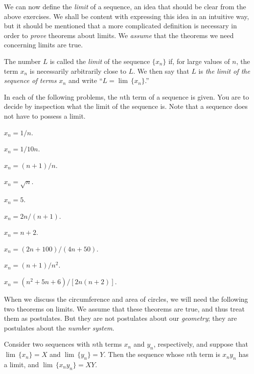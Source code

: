 \documentclass[11pt]{book}
\theoremstyle{bkplain}
\theoremstyle{XIplainnote}
\theoremstyle{bkplain}
\theoremstyle{bkplain}
\begin{document}
We can now define the \emph{limit} of a sequence, an idea that should be clear
from the above exercises. We shall be content with expressing this idea in an
intuitive way, but it should be mentioned that a more complicated definition is
necessary in order to \emph{prove} theorems about limits. We \emph{assume} that
the theorems we need concerning limits are true.

\begin{definition}
The number $L$ is called the \emph{limit} of the sequence $\{x_n\}$ if, for
large values of $n$, the term $x_n$ is necessarily arbitrarily close to $L$. We
then say that $L$ is \emph{the limit of the sequence of terms $x_n$} and write
``$L = \lim\,\{x_n\}$.''
\end{definition}

In each of the following problems, the $n$th term of a sequence is given. You
are to decide by inspection what the limit of the sequence is. Note that a
sequence does not have to possess a limit.
\begin{exercisecols}
\begin{exlist}
\item $x_n = 1/n$.
\item $x_n = 1/10n$.
\item $x_n = (n+1)/n$.
\item $x_n = \sqrt{n}$.
\item $x_n = 5$.
\item $x_n = 2n/(n+1)$.
\item $x_n = n + 2$.
\item[\stex 8.] $x_n = (2n + 100)/(4n + 50)$.
\item[\stex 9.] $x_n = (n + 1)/n^2$.
\item[\stex 10.] $x_n = (n^2 + 5n + 6)/[2n(n + 2)]$.
\end{exlist}
\end{exercisecols}

When we discuss the circumference and area of circles, we will need the
following two theorems on limits. We assume that these theorems are true, and
thus treat them as postulates. But they are not postulates about our
\emph{geometry}; they are postulates about the \emph{number system}.

\begin{theorem}
Consider two sequences with $n$th terms $x_n$ and $y_n$, respectively, and
suppose that $\lim\,\{x_n\} = X$ and $\lim\,\{y_n\} = Y$. Then the sequence
whose $n$th term is $x_n y_n$ has a limit, and $\lim\,\{x_n y_n\} = XY$.
\end{theorem}
\end{document}

